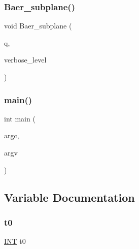 \subsubsection{\texorpdfstring{Baer\+\_\+subplane()}{Baer\_subplane()}}
{\footnotesize\ttfamily void Baer\+\_\+subplane (\begin{DoxyParamCaption}\item[{\mbox{\hyperlink{galois_8h_a09fddde158a3a20bd2dcadb609de11dc}{I\+NT}}}]{q,  }\item[{\mbox{\hyperlink{galois_8h_a09fddde158a3a20bd2dcadb609de11dc}{I\+NT}}}]{verbose\+\_\+level }\end{DoxyParamCaption})}

\mbox{\label{baer__subplane_8_c_a3c04138a5bfe5d72780bb7e82a18e627}} 
\subsubsection{\texorpdfstring{main()}{main()}}
{\footnotesize\ttfamily int main (\begin{DoxyParamCaption}\item[{int}]{argc,  }\item[{char $\ast$$\ast$}]{argv }\end{DoxyParamCaption})}



\subsection{Variable Documentation}
\mbox{\label{baer__subplane_8_c_a4268f4fe222ffb119218a0199f5e1904}} 
\subsubsection{\texorpdfstring{t0}{t0}}
{\footnotesize\ttfamily \mbox{\hyperlink{galois_8h_a09fddde158a3a20bd2dcadb609de11dc}{I\+NT}} t0}

